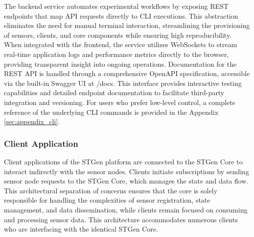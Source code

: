 \documentclass[jsan,article,submit,moreauthors,pdftex]{Definitions/mdpi}
\begin{document}
The backend service automates experimental workflows by exposing REST endpoints that map API requests directly to CLI executions. This abstraction eliminates the need for manual terminal interaction, streamlining the provisioning of sensors, clients, and core components while ensuring high reproducibility. When integrated with the frontend, the service utilizes WebSockets to stream real-time application logs and performance metrics directly to the browser, providing transparent insight into ongoing operations.
Documentation for the REST API is handled through a comprehensive OpenAPI specification, accessible via the built-in Swagger UI at /docs. This interface provides interactive testing capabilities and detailed endpoint documentation to facilitate third-party integration and versioning. For users who prefer low-level control, a complete reference of the underlying CLI commands is provided in the Appendix \ref{sec:appendix_cli}.

\subsubsection{Client Application}
\label{Client-Application}
     Client applications of the STGen platform are connected to the STGen Core to interact indirectly with the sensor nodes. Clients initiate subscriptions by sending sensor node requests to the STGen Core, which manages the state and data flow. This architectural separation of concerns ensures that the core is solely responsible for handling the complexities of sensor registration, state management, and data dissemination, while clients remain focused on consuming and processing sensor data. This architecture accommodates numerous clients who are interfacing with the identical STGen Core. 

    
\end{document}
